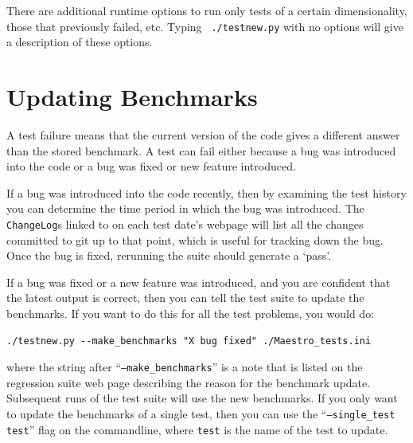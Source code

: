 There are additional runtime options to run only tests of a certain
dimensionality, those that previously failed, etc.  Typing {\tt
  ./testnew.py} with no options will give a description of these
options.


\section{Updating Benchmarks}

A test failure means that the current version of the code gives a
different answer than the stored benchmark.  A test can fail either
because a bug was introduced into the code or a bug was fixed or new
feature introduced.

If a bug was introduced into the code recently, then by examining the
test history you can determine the time period in which the bug was
introduced.  The {\tt ChangeLog}s linked to on each test date's webpage
will list all the changes committed to git up to that point, which is
useful for tracking down the bug.  Once the bug is fixed, rerunning
the suite should generate a `pass'.

If a bug was fixed or a new feature was introduced, and you are
confident that the latest output is correct, then you can tell the
test suite to update the benchmarks.  If you want to do this for all
the test problems, you would do:
\begin{verbatim}
./testnew.py --make_benchmarks "X bug fixed" ./Maestro_tests.ini
\end{verbatim}
where the string after ``{\tt --make\_benchmarks}'' is a note that is listed
on the regression suite web page describing the reason for the benchmark
update.  Subsequent runs of the test suite will use the new benchmarks.
If you only want to update the benchmarks of a single test, then you
can use the ``{\tt --single\_test test}'' flag on the commandline, where
{\tt test} is the name of the test to update.

